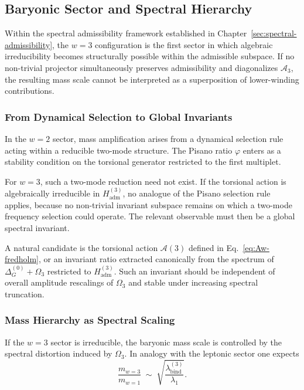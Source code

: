 \subsection{Baryonic Sector and Spectral Hierarchy}
  \label{sec:baryonic-sector}

  Within the spectral admissibility framework established in Chapter~\ref{sec:spectral-admissibility},
  the $w=3$ configuration is the first sector in which algebraic
  irreducibility becomes structurally possible within the admissible
  subspace.
  If no non-trivial projector simultaneously preserves admissibility and
  diagonalizes $\mathcal{A}_3$, the resulting mass scale cannot be
  interpreted as a superposition of lower-winding contributions.

  \subsubsection*{From Dynamical Selection to Global Invariants}

    In the $w=2$ sector, mass amplification arises from a dynamical
    selection rule acting within a reducible two-mode structure.
    The Pisano ratio $\varphi$ enters as a stability condition on the
    torsional generator restricted to the first multiplet.

    For $w=3$, such a two-mode reduction need not exist.
    If the torsional action is algebraically irreducible in
    $H_{\mathrm{adm}}^{(3)}$, no analogue of the Pisano selection rule
    applies, because no non-trivial invariant subspace remains on which
    a two-mode frequency selection could operate.
    The relevant observable must then be a global spectral invariant.

    A natural candidate is the torsional action
    \(
    \mathcal{A}(3)
    \)
    defined in Eq.~\eqref{eq:Aw-fredholm},
    or an invariant ratio extracted canonically from the spectrum of
    \(
    \Delta^{(0)}_G+\Omega_3
    \)
    restricted to $H_{\mathrm{adm}}^{(3)}$.
    Such an invariant should be independent of overall amplitude
    rescalings of $\Omega_3$ and stable under increasing spectral
    truncation.

  \subsubsection*{Mass Hierarchy as Spectral Scaling}

    If the $w=3$ sector is irreducible,
    the baryonic mass scale is controlled by the spectral distortion
    induced by $\Omega_3$.
    In analogy with the leptonic sector one expects
    \begin{equation}
      \frac{m_{w=3}}{m_{w=1}}
      \;\sim\;
      \sqrt{
        \frac{\lambda_{\mathrm{bind}}^{(3)}}
        {\lambda_{1}}
      }.
    \end{equation}

